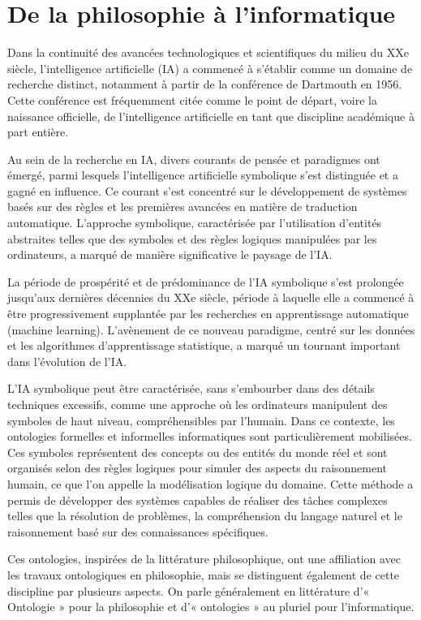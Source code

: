 \documentclass[12pt]{report}
\begin{document}
\section{De la philosophie à l'informatique}
Dans la continuité des avancées technologiques et scientifiques du milieu du XXe siècle, l'intelligence artificielle (IA) a commencé à s'établir comme un domaine de recherche distinct, notamment à partir de la conférence de Dartmouth en 1956. Cette conférence est fréquemment citée comme le point de départ, voire la naissance officielle, de l'intelligence artificielle en tant que discipline académique à part entière.

Au sein de la recherche en IA, divers courants de pensée et paradigmes ont émergé, parmi lesquels l'intelligence artificielle symbolique s'est distinguée et a gagné en influence. Ce courant s'est concentré sur le développement de systèmes basés sur des règles et les premières avancées en matière de traduction automatique. L'approche symbolique, caractérisée par l'utilisation d'entités abstraites telles que des symboles et des règles logiques manipulées par les ordinateurs, a marqué de manière significative le paysage de l'IA.

La période de prospérité et de prédominance de l'IA symbolique s'est prolongée jusqu'aux dernières décennies du XXe siècle, période à laquelle elle a commencé à être progressivement supplantée par les recherches en apprentissage automatique (machine learning). L'avènement de ce nouveau paradigme, centré sur les données et les algorithmes d'apprentissage statistique, a marqué un tournant important dans l'évolution de l'IA\autocite{Brooks1990Elephants}.

L'IA symbolique peut être caractérisée, sans s'embourber dans des détails techniques excessifs, comme une approche où les ordinateurs manipulent des symboles de haut niveau, compréhensibles par l'humain. Dans ce contexte, les ontologies formelles et informelles informatiques sont particulièrement mobilisées. Ces symboles représentent des concepts ou des entités du monde réel et sont organisés selon des règles logiques pour simuler des aspects du raisonnement humain, ce que l'on appelle la modélisation logique du domaine. Cette méthode a permis de développer des systèmes capables de réaliser des tâches complexes telles que la résolution de problèmes, la compréhension du langage naturel et le raisonnement basé sur des connaissances spécifiques.

Ces ontologies, inspirées de la littérature philosophique, ont une affiliation avec les travaux ontologiques en philosophie, mais se distinguent également de cette discipline par plusieurs aspects. On parle généralement en littérature d'« Ontologie » pour la philosophie et d'« ontologies » au pluriel pour l'informatique\autocite{inbook}.
\end{document}
